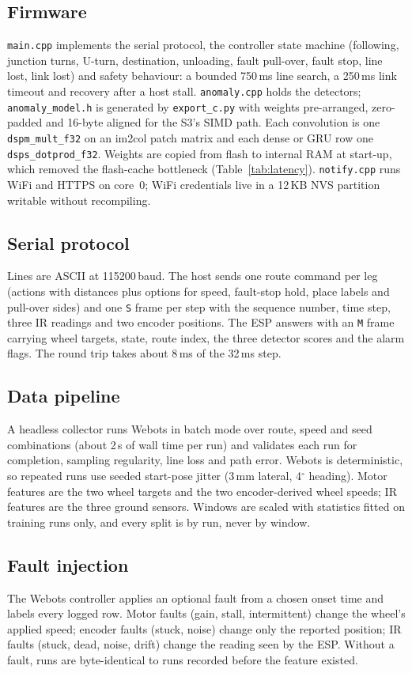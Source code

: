 \documentclass[conference]{IEEEtran}
\begin{document}
\subsection{Firmware}
\texttt{main.cpp} implements the serial protocol, the controller state machine
(following, junction turns, U-turn, destination, unloading, fault pull-over,
fault stop, line lost, link lost) and safety behaviour: a bounded 750\,ms line
search, a 250\,ms link timeout and recovery after a host stall.
\texttt{anomaly.cpp} holds the detectors; \texttt{anomaly\_model.h} is generated
by \texttt{export\_c.py} with weights pre-arranged, zero-padded and 16-byte
aligned for the S3's SIMD path. Each convolution is one \texttt{dspm\_mult\_f32}
on an im2col patch matrix and each dense or GRU row one
\texttt{dsps\_dotprod\_f32}. Weights are copied from flash to internal RAM at
start-up, which removed the flash-cache bottleneck (Table~\ref{tab:latency}).
\texttt{notify.cpp} runs WiFi and HTTPS on core~0; WiFi credentials live in a
12\,KB NVS partition writable without recompiling.

\subsection{Serial protocol}
Lines are ASCII at 115200\,baud. The host sends one route command per leg
(actions with distances plus options for speed, fault-stop hold, place labels and
pull-over sides) and one \texttt{S} frame per step with the sequence number, time
step, three IR readings and two encoder positions. The ESP answers with an
\texttt{M} frame carrying wheel targets, state, route index, the three detector
scores and the alarm flags. The round trip takes about 8\,ms of the 32\,ms step.

\subsection{Data pipeline}
A headless collector runs Webots in batch mode over route, speed and seed
combinations (about 2\,s of wall time per run) and validates each run for
completion, sampling regularity, line loss and path error. Webots is
deterministic, so repeated runs use seeded start-pose jitter (3\,mm lateral,
4$^\circ$ heading). Motor features are the two wheel targets and the two
encoder-derived wheel speeds; IR features are the three ground sensors. Windows
are scaled with statistics fitted on training runs only, and every split is by
run, never by window.

\subsection{Fault injection}
The Webots controller applies an optional fault from a chosen onset time and
labels every logged row. Motor faults (gain, stall, intermittent) change the
wheel's applied speed; encoder faults (stuck, noise) change only the reported
position; IR faults (stuck, dead, noise, drift) change the reading seen by the
ESP. Without a fault, runs are byte-identical to runs recorded before the
feature existed.
\end{document}
